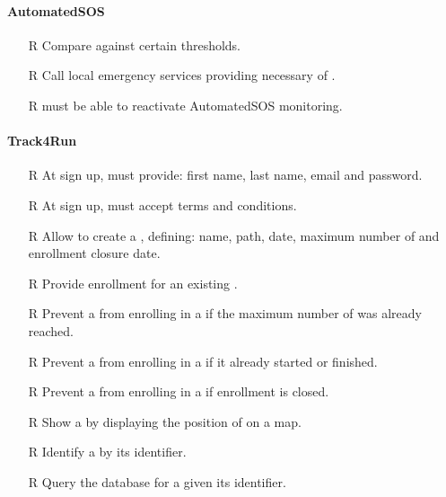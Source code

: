 \documentclass[../../../rasd.tex]{subfiles}
\begin{document}
        \paragraph{AutomatedSOS}
        \begin{itemize}
            \item[R\subs{36}]Compare  against certain thresholds.
            \item[R\subs{37}]Call local emergency services providing necessary  of .
            \item[R\subs{38}] must be able to reactivate AutomatedSOS monitoring.
        \end{itemize}

        \paragraph{Track4Run}
        \begin{itemize}
            \item[R\subs{39}]At sign up,  must provide: first name, last name, email and password.
            \item[R\subs{40}]At sign up,  must accept terms and conditions.
            \item[R\subs{41}]Allow  to create a , defining: name, path, date, maximum number of  and enrollment closure date. 
            \item[R\subs{42}]Provide  enrollment for an existing .
            \item[R\subs{43}]Prevent a  from enrolling in a  if the maximum number of  was already reached.
            \item[R\subs{44}]Prevent a  from enrolling in a  if it already started or finished.
            \item[R\subs{45}]Prevent a  from enrolling in a  if enrollment is closed.
            \item[R\subs{46}]Show a  by displaying the position of  on a map.
            \item[R\subs{47}]Identify a  by its identifier.
            \item[R\subs{48}]Query the database for a  given its identifier.
        \end{itemize}
\end{document}

